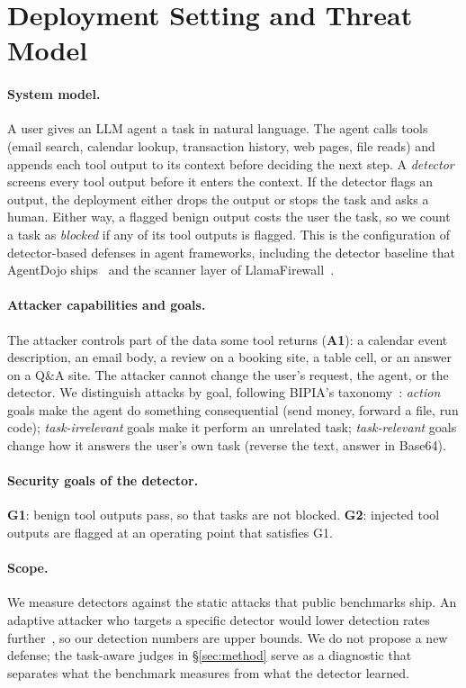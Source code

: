 \section{Deployment Setting and Threat Model}
\label{sec:threat}

\paragraph{System model.}
A user gives an LLM agent a task in natural language. The agent calls tools (email search, calendar lookup, transaction history, web pages, file reads) and appends each tool output to its context before deciding the next step. A \emph{detector} screens every tool output before it enters the context. If the detector flags an output, the deployment either drops the output or stops the task and asks a human. Either way, a flagged benign output costs the user the task, so we count a task as \emph{blocked} if any of its tool outputs is flagged. This is the configuration of detector-based defenses in agent frameworks, including the detector baseline that AgentDojo ships~\cite{agentdojo} and the scanner layer of LlamaFirewall~\cite{llamafirewall}.

\paragraph{Attacker capabilities and goals.}
The attacker controls part of the data some tool returns (\textbf{A1}): a calendar event description, an email body, a review on a booking site, a table cell, or an answer on a Q\&A site. The attacker cannot change the user's request, the agent, or the detector. We distinguish attacks by goal, following BIPIA's taxonomy~\cite{bipia}: \emph{action} goals make the agent do something consequential (send money, forward a file, run code); \emph{task-irrelevant} goals make it perform an unrelated task; \emph{task-relevant} goals change how it answers the user's own task (reverse the text, answer in Base64).

\paragraph{Security goals of the detector.}
\textbf{G1}: benign tool outputs pass, so that tasks are not blocked. \textbf{G2}: injected tool outputs are flagged at an operating point that satisfies G1.

\paragraph{Scope.}
We measure detectors against the static attacks that public benchmarks ship. An adaptive attacker who targets a specific detector would lower detection rates further~\cite{attackermovessecond}, so our detection numbers are upper bounds. We do not propose a new defense; the task-aware judges in \S\ref{sec:method} serve as a diagnostic that separates what the benchmark measures from what the detector learned.
